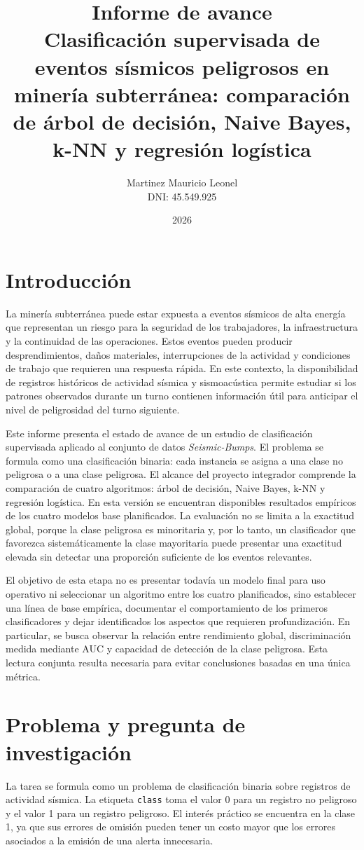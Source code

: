\documentclass[12pt,a4paper]{article}
\title{Informe de avance\\[0.75em]Clasificación supervisada de eventos sísmicos peligrosos en minería subterránea: comparación de árbol de decisión, Naive Bayes, k-NN y regresión logística}
\author{Martinez Mauricio Leonel\\DNI: 45.549.925}
\date{2026}
\begin{document}
\maketitle

\section{Introducción}
La minería subterránea puede estar expuesta a eventos sísmicos de alta energía que representan un riesgo para la seguridad de los trabajadores, la infraestructura y la continuidad de las operaciones. Estos eventos pueden producir desprendimientos, daños materiales, interrupciones de la actividad y condiciones de trabajo que requieren una respuesta rápida. En este contexto, la disponibilidad de registros históricos de actividad sísmica y sismoacústica permite estudiar si los patrones observados durante un turno contienen información útil para anticipar el nivel de peligrosidad del turno siguiente.

Este informe presenta el estado de avance de un estudio de clasificación supervisada aplicado al conjunto de datos \textit{Seismic-Bumps}. El problema se formula como una clasificación binaria: cada instancia se asigna a una clase no peligrosa o a una clase peligrosa. El alcance del proyecto integrador comprende la comparación de cuatro algoritmos: árbol de decisión, Naive Bayes, k-NN y regresión logística. En esta versión se encuentran disponibles resultados empíricos de los cuatro modelos base planificados. La evaluación no se limita a la exactitud global, porque la clase peligrosa es minoritaria y, por lo tanto, un clasificador que favorezca sistemáticamente la clase mayoritaria puede presentar una exactitud elevada sin detectar una proporción suficiente de los eventos relevantes.

El objetivo de esta etapa no es presentar todavía un modelo final para uso operativo ni seleccionar un algoritmo entre los cuatro planificados, sino establecer una línea de base empírica, documentar el comportamiento de los primeros clasificadores y dejar identificados los aspectos que requieren profundización. En particular, se busca observar la relación entre rendimiento global, discriminación medida mediante AUC y capacidad de detección de la clase peligrosa. Esta lectura conjunta resulta necesaria para evitar conclusiones basadas en una única métrica.

\section{Problema y pregunta de investigación}
La tarea se formula como un problema de clasificación binaria sobre registros de actividad sísmica. La etiqueta \texttt{class} toma el valor 0 para un registro no peligroso y el valor 1 para un registro peligroso. El interés práctico se encuentra en la clase 1, ya que sus errores de omisión pueden tener un costo mayor que los errores asociados a la emisión de una alerta innecesaria.
\end{document}
